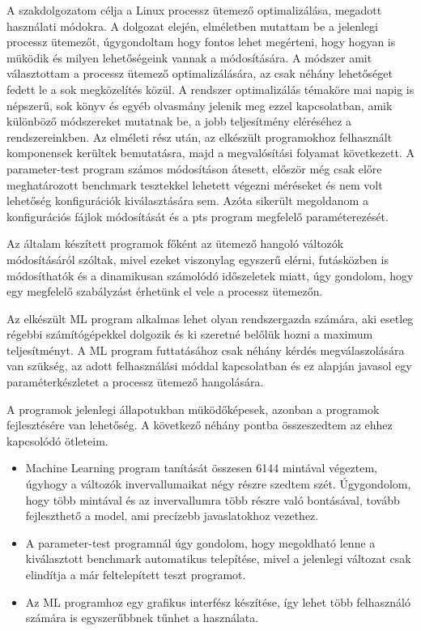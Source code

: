 
A szakdolgozatom célja a Linux processz ütemező optimalizálása, megadott használati módokra.
A dolgozat elején, elméletben mutattam be a jelenlegi processz ütemezőt, úgygondoltam hogy fontos lehet megérteni, hogy hogyan is müködik és milyen lehetőségeink vannak a módosítására.
A módszer amit választottam a processz ütemező optimalizálására, az csak néhány lehetőséget fedett le a sok megközelítés közül. A rendszer optimalizálás témaköre mai napig is népszerű, sok könyv és egyéb olvasmány jelenik meg ezzel kapcsolatban, amik különböző módszereket mutatnak be, a jobb teljesítmény eléréséhez a rendszereinkben.
Az elméleti rész után, az elkészült programokhoz felhasznált komponensek kerültek bemutatásra, majd a megvalósítási folyamat következett. A parameter-test program számos módosításon átesett, először még csak előre meghatározott benchmark tesztekkel lehetett végezni méréseket és nem volt lehetőség konfigurációk kiválasztására sem. Azóta sikerült megoldanom a konfigurációs fájlok módosítását és a pts program megfelelő paraméterezését. 

Az általam készített programok főként az ütemező hangoló változók módosításáról szóltak, mivel ezeket viszonylag egyszerű elérni, futásközben is módosíthatók és a dinamikusan számolódó időszeletek miatt, úgy gondolom, hogy egy megfelelő szabályzást érhetünk el vele a processz ütemezőn.

Az elkészült ML program alkalmas lehet olyan rendszergazda számára, aki esetleg régebbi számítógépekkel dolgozik és ki szeretné belőlük hozni a maximum teljesítményt.
A ML program futtatásához csak néhány kérdés megválaszolására van szükség, az adott felhasználási móddal kapcsolatban és ez alapján javasol egy paraméterkészletet a processz ütemező hangolására.

A programok jelenlegi állapotukban müködőképesek, azonban a programok fejlesztésére van lehetőség. A következő néhány pontba összeszedtem az ehhez kapcsolódó ötleteim.
\begin{itemize}
\item Machine Learning program tanítását összesen 6144 mintával végeztem, úgyhogy a változók invervallumaikat négy részre szedtem szét. Úgygondolom, hogy több mintával és az invervallumra több részre való bontásával, tovább fejleszthető a model, ami precízebb javaslatokhoz vezethez.
\item A parameter-test programnál úgy gondolom, hogy megoldható lenne a kiválasztott benchmark automatikus telepítése, mivel a jelenlegi változat csak elindítja a már feltelepített teszt programot.
\item Az ML programhoz egy grafikus interfész készítése, így lehet több felhasználó számára  is egyszerűbbnek tűnhet a használata.
\end{itemize}

